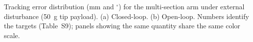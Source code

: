 \caption{Tracking error distribution (mm and $^\circ$) for the multi-section arm under external disturbance (50~g tip payload). (a) Closed-loop. (b) Open-loop. Numbers identify the targets (Table~S9); panels showing the same quantity share the same color scale.}
